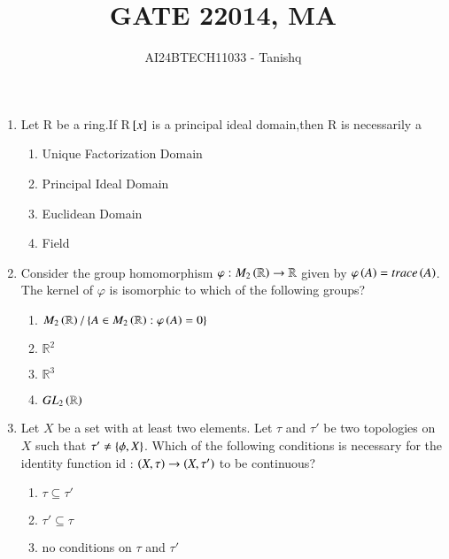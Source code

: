 \documentclass[journal]{IEEEtran}
\begin{document}

\vspace{3cm}
\author{AI24BTECH11033 - Tanishq}
\title{GATE 2}
{\let\newpage\relax\maketitle}
\title{2014, MA}
\renewcommand{\thefigure}{\theenumi}
\renewcommand{\thetable}{\theenumi}
\setlength{\intextsep}{10pt} %
\renewcommand{\thetable}{\theenumi}
\begin{enumerate}
  \item Let R be a ring.If R${}\left[x\right]$ is a principal ideal domain,then R is necessarily a
  \begin{enumerate}
      \item Unique Factorization Domain
      \item Principal Ideal Domain
      \item Euclidean Domain
      \item Field
  \end{enumerate}
  \item Consider the group homomorphism $\varphi : M_2\left(\mathbb{R}\right) \rightarrow \mathbb{R}$ given by $\varphi \left(A\right) = trace\left(A\right)$. The kernel of $\varphi$ is isomorphic to which of the following groups?
\begin{enumerate}
    \item $M_2\left(\mathbb{R}\right) / \left\{ A \in M_2\left(\mathbb{R}\right) : \varphi\left(A\right) = 0 \right\}$
    \item $\mathbb{R}^2$
    \item $\mathbb{R}^3$
    \item $GL_2\left(\mathbb{R}\right)$
\end{enumerate}
   \item Let $X$ be a set with at least two elements. Let $\tau$ and $\tau'$ be two topologies on $X$ such that $\tau' \neq  \left\{\phi , X\right\}$. Which of the following conditions is necessary for the identity function id : $\left(X , \tau\right) \rightarrow \left(X , \tau'\right)$ to be continuous? 
   \begin{enumerate}
      \item $\tau \subseteq \tau'$
      \item $\tau' \subseteq \tau$
      \item no conditions on $\tau$ and $\tau'$

\end{enumerate}
\end{enumerate}
\end{document}
